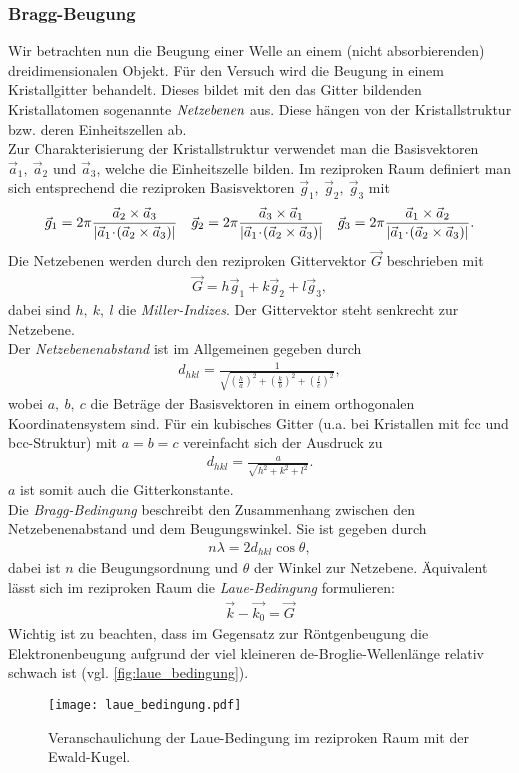 \subsubsection{Bragg-Beugung}
Wir betrachten nun die Beugung einer Welle an einem (nicht absorbierenden) dreidimensionalen Objekt. Für den Versuch wird die Beugung in einem Kristallgitter behandelt. Dieses bildet mit den das Gitter bildenden Kristallatomen sogenannte $\emph{Netzebenen}$ aus. Diese hängen von der Kristallstruktur bzw. deren Einheitszellen ab.\\
Zur Charakterisierung der Kristallstruktur verwendet man die Basisvektoren $\vec{a}_1,~\vec{a}_2$ und $\vec{a}_3$, welche die Einheitszelle bilden. Im reziproken Raum definiert man sich entsprechend die reziproken Basisvektoren $\vec{g}_1,~\vec{g}_2,~\vec{g}_3$ mit
\begin{align}
\vec{g}_1=2\pi\frac{\vec{a}_2\times\vec{a}_3}{\left|\vec{a}_1\!\cdot\! (\vec{a}_2\times\vec{a}_3)\right|}\quad
\vec{g}_2=2\pi\frac{\vec{a}_3\times\vec{a}_1}{\left|\vec{a}_1\!\cdot\! (\vec{a}_2\times\vec{a}_3)\right|}\quad
\vec{g}_3=2\pi\frac{\vec{a}_1\times\vec{a}_2}{\left|\vec{a}_1\!\cdot\! (\vec{a}_2\times\vec{a}_3)\right|}.
\end{align}
Die Netzebenen werden durch den reziproken Gittervektor $\vec{G}$ beschrieben mit
\begin{align}
\vec{G}=h\vec{g}_1+k\vec{g}_2+l\vec{g}_3,
\end{align}
dabei sind $h,~k,~l$ die \emph{Miller-Indizes}. Der Gittervektor steht senkrecht zur Netzebene.\\
Der \emph{Netzebenenabstand} ist im Allgemeinen gegeben durch
\begin{align}
d_{hkl}=\frac{1}{\sqrt{\left(\frac{h}{a}\right)^2+\left(\frac{k}{b}\right)^2+\left(\frac{l}{c}\right)^2}},
\end{align}
wobei $a,~b,~c$ die Beträge der Basisvektoren in einem orthogonalen Koordinatensystem sind. Für ein kubisches Gitter (u.a. bei Kristallen mit fcc und bcc-Struktur) mit $a=b=c$ vereinfacht sich der Ausdruck zu
\begin{align}
d_{hkl}=\frac{a}{\sqrt{h^2+k^2+l^2}}.
\end{align}
$a$ ist somit auch die Gitterkonstante.\\
Die \emph{Bragg-Bedingung} beschreibt den Zusammenhang zwischen den Netzebenenabstand und dem Beugungswinkel. Sie ist gegeben durch
\begin{align}
n\lambda=2d_{hkl}\cos\theta,
\end{align}
dabei ist $n$ die Beugungsordnung und $\theta$ der Winkel zur Netzebene.
Äquivalent lässt sich im reziproken Raum die \emph{Laue-Bedingung} formulieren:
\begin{align}
\vec{k}-\vec{k_0}=\vec{G}
\end{align}
Wichtig ist zu beachten, dass im Gegensatz zur Röntgenbeugung die Elektronenbeugung aufgrund der viel kleineren de-Broglie-Wellenlänge relativ schwach ist (vgl. \autoref{fig:laue_bedingung}).
\begin{figure}[h]
	\centering
	\texttt{[image: laue\_bedingung.pdf]}
	\caption[Laue-Bedingung]{Veranschaulichung der Laue-Bedingung im reziproken Raum mit der Ewald-Kugel.}
	\label{fig:laue_bedingung}
\end{figure}
